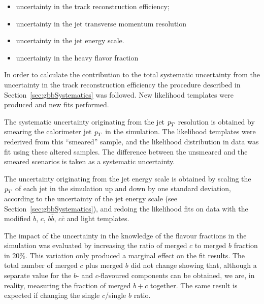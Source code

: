 \begin{itemize}\addtolength{\itemsep}{-0.4\baselineskip}
\item
uncertainty in the track reconstruction efficiency;
\item
uncertainty in the jet transverse momentum resolution 
\item
uncertainty in the jet energy scale.
\item
uncertainty in the heavy flavor fraction
\end{itemize}


In order to calculate the contribution to the total systematic uncertainty from the uncertainty in the track reconstruction efficiency the procedure described in Section~\ref{sec:gbbSystematics} was followed. New likelihood templates were produced and new fits performed. 

The systematic uncertainty originating from the jet  ${\emph{p}_{T}}$ resolution is obtained by smearing the calorimeter jet ${\emph{p}_{T}}$ in the simulation. The likelihood templates were rederived from this ``smeared'' sample, and the likelihood distribution in data was fit using these altered samples. The difference between the unsmeared and the smeared scenarios is taken as a systematic uncertainty. 

The uncertainty originating from the jet energy scale is obtained by scaling the ${\emph{p}_{T}}$ of each jet in the simulation up and down by one standard deviation, according to the uncertainty of the jet energy scale (see Section~\ref{sec:gbbSystematics}), and redoing the likelihood fits on data with the modified $b$, $c$, $b\bar{b}$, $c\bar{c}$ and light templates.

The impact of the uncertainty in the knowledge of the flavour fractions in the simulation was evaluated by increasing the ratio of merged $c$ to merged $b$ fraction in 20\%. This variation only produced a marginal effect on the fit results. The total number of merged $c$ plus merged $b$ did not change showing that, although a separate value for the $b$- and $c$-flavoured components can be obtained, we are,  in reality, measuring the fraction of merged $b+c$ together. The same result is expected if changing the single $c$/single $b$ ratio.

